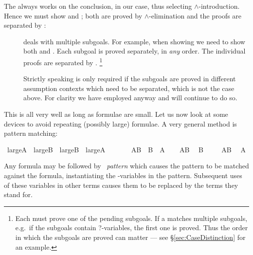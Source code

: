 \begin{isabellebody}
\isacommand{{\isachardot}{\isachardot}}\isanewline
\isamarkupfalse%
\isamarkupfalse%
%
\begin{isamarkuptext}%
\noindent The  always works on the conclusion,
 in our case, thus selecting $\land$-introduction. Hence
we must show  and ; both are proved by
$\land$-elimination and the proofs are separated by :
\begin{description}
\item[] deals with multiple subgoals. For example,
when showing  we need to show both  and .  Each subgoal is proved separately, in \emph{any} order. The
individual proofs are separated by .  \footnote{Each
 must prove one of the pending subgoals.  If a
 matches multiple subgoals, e.g.\ if the subgoals
contain ?-variables, the first one is proved. Thus the order in which
the subgoals are proved can matter --- see
\S\ref{sec:CaseDistinction} for an example.}

Strictly speaking  is only required if the subgoals
are proved in different assumption contexts which need to be
separated, which is not the case above. For clarity we
have employed  anyway and will continue to do so.
\end{description}

This is all very well as long as formulae are small. Let us now look at some
devices to avoid repeating (possibly large) formulae. A very general method
is pattern matching:%
\end{isamarkuptext}%
\isamarkuptrue%
\ {\isachardoublequote}large{\isacharunderscore}A\ {\isasymand}\ large{\isacharunderscore}B\ {\isasymLongrightarrow}\ large{\isacharunderscore}B\ {\isasymand}\ large{\isacharunderscore}A{\isachardoublequote}\isanewline
\ \ \ \ \ \ {\isacharparenleft}\ {\isachardoublequote}{\isacharquery}AB\ {\isasymLongrightarrow}\ {\isacharquery}B\ {\isasymand}\ {\isacharquery}A{\isachardoublequote}{\isacharparenright}\isanewline
\isamarkupfalse%
\isanewline
\ \ \isamarkupfalse%
\ {\isachardoublequote}{\isacharquery}AB{\isachardoublequote}\ \isamarkupfalse%
\ {\isachardoublequote}{\isacharquery}B{\isachardoublequote}\ \isamarkupfalse%
\isacommand{{\isachardot}{\isachardot}}\isanewline
\isamarkupfalse%
\isanewline
\ \ \isamarkupfalse%
\ {\isachardoublequote}{\isacharquery}AB{\isachardoublequote}\ \isamarkupfalse%
\ {\isachardoublequote}{\isacharquery}A{\isachardoublequote}\ \isamarkupfalse%
\isacommand{{\isachardot}{\isachardot}}\isanewline
\isamarkupfalse%
\isamarkupfalse%
%
\begin{isamarkuptext}%
\noindent Any formula may be followed by
\isa{{\isacharparenleft}}~\emph{pattern}\isa{{\isacharparenright}} which causes the pattern
to be matched against the formula, instantiating the \isa{{\isacharquery}}-variables in
the pattern. Subsequent uses of these variables in other terms causes
them to be replaced by the terms they stand for.


\end{isamarkuptext}
\end{isabellebody}
